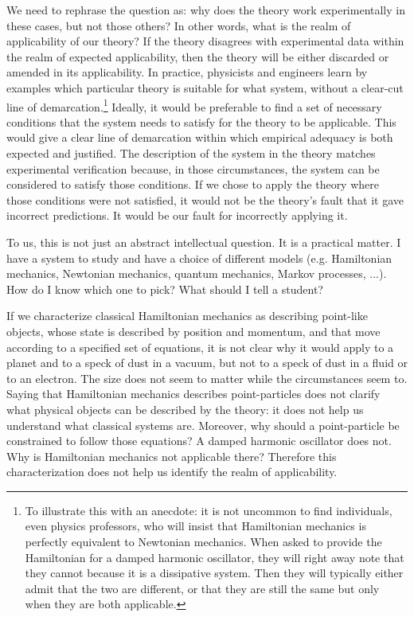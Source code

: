 \documentclass[11pt]{article}
\begin{document}
We need to rephrase the question as: why does the theory work experimentally in these cases, but not those others? In other words, what is the realm of applicability of our theory? If the theory disagrees with experimental data within the realm of expected applicability, then the theory will be either discarded or amended in its applicability. In practice, physicists and engineers learn by examples which particular theory is suitable for what system, without a clear-cut line of demarcation.\footnote{To illustrate this with an anecdote: it is not uncommon to find individuals, even physics professors, who will insist that Hamiltonian mechanics is perfectly equivalent to Newtonian mechanics. When asked to provide the Hamiltonian for a damped harmonic oscillator, they will right away note that they cannot because it is a dissipative system. Then they will typically either admit that the two are different, or that they are still the same but only when they are both applicable.} Ideally, it would be preferable to find a set of necessary conditions that the system needs to satisfy for the theory to be applicable. This would give a clear line of demarcation within which empirical adequacy is both expected and justified. The description of the system in the theory matches experimental verification because, in those circumstances, the system can be considered to satisfy those conditions. If we chose to apply the theory where those conditions were not satisfied, it would not be the theory's fault that it gave incorrect predictions. It would be our fault for incorrectly applying it.

To us, this is not just an abstract intellectual question. It is a practical matter. I have a system to study and have a choice of different models (e.g. Hamiltonian mechanics, Newtonian mechanics, quantum mechanics, Markov processes, ...). How do I know which one to pick?  What should I tell a student?

If we characterize classical Hamiltonian mechanics as describing point-like objects, whose state is described by position and momentum, and that move according to a specified set of equations, it is not clear why it would apply to a planet and to a speck of dust in a vacuum, but not to a speck of dust in a fluid or to an electron. The size does not seem to matter while the circumstances seem to. Saying that Hamiltonian mechanics describes point-particles does not clarify what physical objects can be described by the theory: it does not help us understand what classical systems are. Moreover, why should a point-particle be constrained to follow those equations? A damped harmonic oscillator does not. Why is Hamiltonian mechanics not applicable there? Therefore this characterization does not help us identify the realm of applicability.
\end{document}
